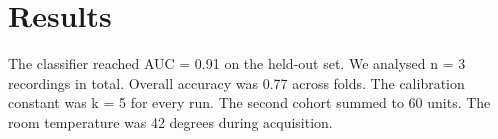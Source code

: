 \section{Results}
The classifier reached AUC = 0.91 on the held-out set.
We analysed n = 3 recordings in total.
Overall accuracy was 0.77 across folds.
The calibration constant was k = 5 for every run.
The second cohort summed to 60 units.
The room temperature was 42 degrees during acquisition.

